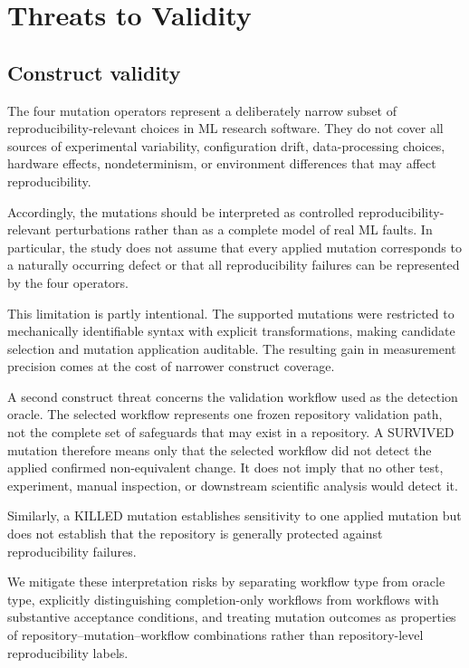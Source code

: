 \section{Threats to Validity}
\label{sec:threats}

\subsection{Construct validity}
\label{sec:threats-construct}

The four mutation operators represent a deliberately narrow subset of
reproducibility-relevant choices in ML research software. They do not cover all
sources of experimental variability, configuration drift, data-processing
choices, hardware effects, nondeterminism, or environment differences that may
affect reproducibility.

Accordingly, the mutations should be interpreted as controlled
reproducibility-relevant perturbations rather than as a complete model of real
ML faults. In particular, the study does not assume that every applied mutation
corresponds to a naturally occurring defect or that all reproducibility
failures can be represented by the four operators.

This limitation is partly intentional. The supported mutations were restricted
to mechanically identifiable syntax with explicit transformations, making
candidate selection and mutation application auditable. The resulting gain in
measurement precision comes at the cost of narrower construct coverage.

A second construct threat concerns the validation workflow used as the
detection oracle. The selected workflow represents one frozen repository
validation path, not the complete set of safeguards that may exist in a
repository. A SURVIVED mutation therefore means only that the selected workflow
did not detect the applied confirmed non-equivalent change. It does not imply
that no other test, experiment, manual inspection, or downstream scientific
analysis would detect it.

Similarly, a KILLED mutation establishes sensitivity to one applied mutation
but does not establish that the repository is generally protected against
reproducibility failures.

We mitigate these interpretation risks by separating workflow type from oracle
type, explicitly distinguishing completion-only workflows from workflows with
substantive acceptance conditions, and treating mutation outcomes as properties
of repository--mutation--workflow combinations rather than repository-level
reproducibility labels.


